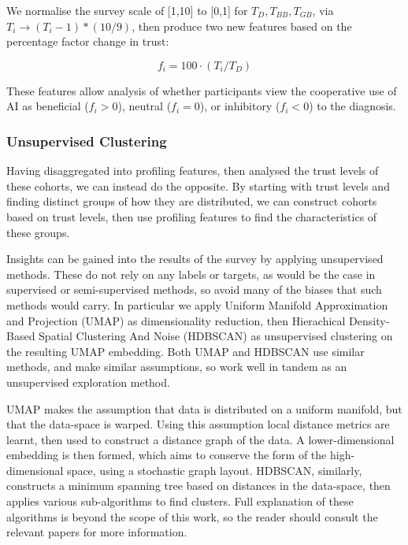 \documentclass[manuscript,screen,review]{acmart}
\begin{document}
We normalise the survey scale of [1,10] to [0,1] for $T_D, T_{BB}, T_{GB}$, via $T_i \rightarrow (T_i - 1) * (10/9)$, then produce two new features based on the percentage factor change in trust:

\begin{equation} \label{eqn:change_vs_doctor}
    f_i = 100 \cdot (T_i / T_D)
\end{equation}

These features allow analysis of whether participants view the cooperative use of AI as beneficial ($f_i > 0$), neutral ($f_i = 0$), or inhibitory ($f_i < 0$) to the diagnosis. 

\subsubsection{Unsupervised Clustering}

Having disaggregated into profiling features, then analysed the trust levels of these cohorts, we can instead do the opposite. By starting with trust levels and finding distinct groups of how they are distributed, we can construct cohorts based on trust levels, then use profiling features to find the characteristics of these groups.

Insights can be gained into the results of the survey by applying unsupervised methods. These do not rely on any labels or targets, as would be the case in supervised or semi-supervised methods, so avoid many of the biases that such methods would carry. In particular we apply Uniform Manifold Approximation and Projection (UMAP) \cite{McInnes2018} as dimensionality reduction, then Hierachical Density-Based Spatial Clustering And Noise (HDBSCAN) \cite{McInnes2017} as unsupervised clustering on the resulting UMAP embedding. Both UMAP and HDBSCAN use similar methods, and make similar assumptions, so work well in tandem as an unsupervised exploration method.

UMAP makes the assumption that data is distributed on a uniform manifold, but that the data-space is warped. Using this assumption local distance metrics are learnt, then used to construct a distance graph of the data. A lower-dimensional embedding is then formed, which aims to conserve the form of the high-dimensional space, using a stochastic graph layout. HDBSCAN, similarly, constructs a minimum spanning tree based on distances in the data-space, then applies various sub-algorithms to find clusters. Full explanation of these algorithms is beyond the scope of this work, so the reader should consult the relevant papers for more information. 
\end{document}
